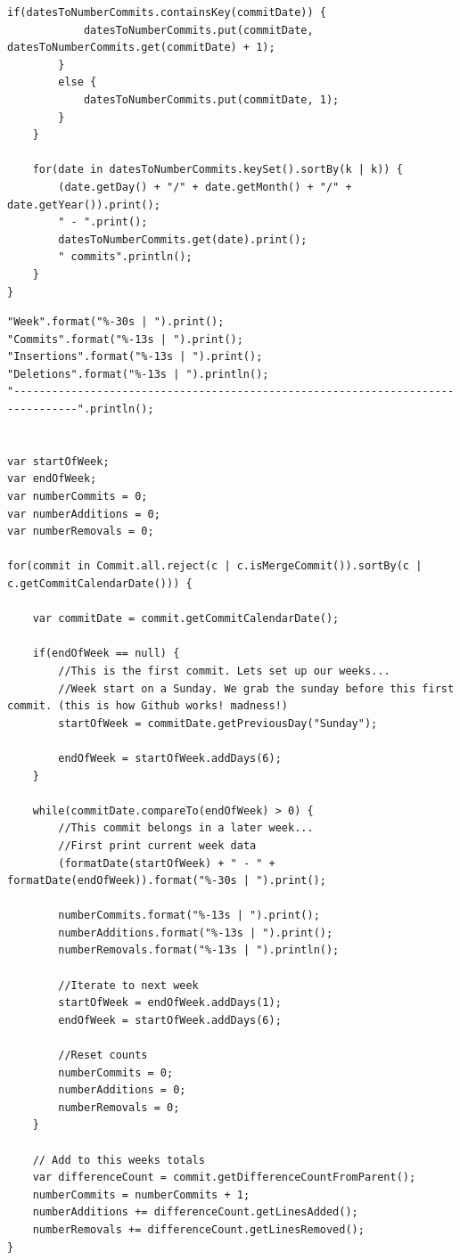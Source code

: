 \documentclass[11pt]{book}
\begin{document}
\begin{appendices}
\begin{lstlisting}[caption=Contribution Dates, label=lst:contributiondates]
		if(datesToNumberCommits.containsKey(commitDate)) {
			datesToNumberCommits.put(commitDate, datesToNumberCommits.get(commitDate) + 1);
		}
		else {
			datesToNumberCommits.put(commitDate, 1);
		}
	}
	
	for(date in datesToNumberCommits.keySet().sortBy(k | k)) {
		(date.getDay() + "/" + date.getMonth() + "/" + date.getYear()).print();
		" - ".print();
		datesToNumberCommits.get(date).print();
		" commits".println();
	}
}
\end{lstlisting}
\clearpage
\begin{lstlisting}[caption=Commit frequency, label=lst:commitfrequency]
"Week".format("%-30s | ").print();
"Commits".format("%-13s | ").print();
"Insertions".format("%-13s | ").print();
"Deletions".format("%-13s | ").println();
"--------------------------------------------------------------------------------".println();


var startOfWeek;
var endOfWeek;
var numberCommits = 0;
var numberAdditions = 0;
var numberRemovals = 0;

for(commit in Commit.all.reject(c | c.isMergeCommit()).sortBy(c | c.getCommitCalendarDate())) {
	
	var commitDate = commit.getCommitCalendarDate();
	
	if(endOfWeek == null) {
		//This is the first commit. Lets set up our weeks...
		//Week start on a Sunday. We grab the sunday before this first commit. (this is how Github works! madness!)
		startOfWeek = commitDate.getPreviousDay("Sunday");
					
		endOfWeek = startOfWeek.addDays(6);
	}
	
	while(commitDate.compareTo(endOfWeek) > 0) {
		//This commit belongs in a later week...
		//First print current week data
		(formatDate(startOfWeek) + " - " + formatDate(endOfWeek)).format("%-30s | ").print();

		numberCommits.format("%-13s | ").print();
		numberAdditions.format("%-13s | ").print();
		numberRemovals.format("%-13s | ").println();
		
		//Iterate to next week
		startOfWeek = endOfWeek.addDays(1);
		endOfWeek = startOfWeek.addDays(6);	
		
		//Reset counts
		numberCommits = 0;
		numberAdditions = 0;
		numberRemovals = 0;
	}
	
	// Add to this weeks totals
	var differenceCount = commit.getDifferenceCountFromParent();
	numberCommits = numberCommits + 1;	
	numberAdditions += differenceCount.getLinesAdded();
	numberRemovals += differenceCount.getLinesRemoved();
}


\end{lstlisting}
\end{appendices}
\end{document}
